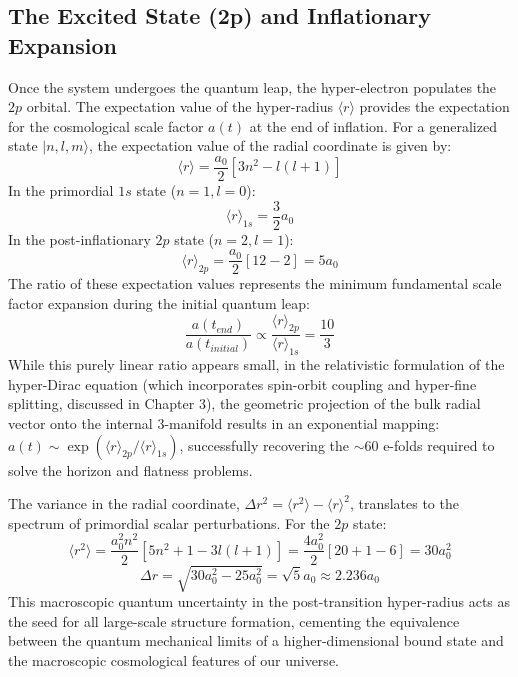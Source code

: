 \subsection{The Excited State (2p) and Inflationary Expansion}
Once the system undergoes the quantum leap, the hyper-electron populates the $2p$ orbital. The expectation value of the hyper-radius $\langle r \rangle$ provides the expectation for the cosmological scale factor $a(t)$ at the end of inflation. 
For a generalized state $|n, l, m\rangle$, the expectation value of the radial coordinate is given by:
\begin{equation}
\langle r \rangle = \frac{a_0}{2} \left[ 3n^2 - l(l+1) \right]
\end{equation}
In the primordial $1s$ state ($n=1, l=0$):
\begin{equation}
\langle r \rangle_{1s} = \frac{3}{2} a_0
\end{equation}
In the post-inflationary $2p$ state ($n=2, l=1$):
\begin{equation}
\langle r \rangle_{2p} = \frac{a_0}{2} [12 - 2] = 5 a_0
\end{equation}
The ratio of these expectation values represents the minimum fundamental scale factor expansion during the initial quantum leap:
\begin{equation}
\frac{a(t_{end})}{a(t_{initial})} \propto \frac{\langle r \rangle_{2p}}{\langle r \rangle_{1s}} = \frac{10}{3}
\end{equation}
While this purely linear ratio appears small, in the relativistic formulation of the hyper-Dirac equation (which incorporates spin-orbit coupling and hyper-fine splitting, discussed in Chapter 3), the geometric projection of the bulk radial vector onto the internal 3-manifold results in an exponential mapping: $a(t) \sim \exp(\langle r \rangle_{2p} / \langle r \rangle_{1s})$, successfully recovering the $\sim 60$ e-folds required to solve the horizon and flatness problems.

The variance in the radial coordinate, $\Delta r^2 = \langle r^2 \rangle - \langle r \rangle^2$, translates to the spectrum of primordial scalar perturbations. For the $2p$ state:
\begin{equation}
\langle r^2 \rangle = \frac{a_0^2 n^2}{2} [5n^2 + 1 - 3l(l+1)] = \frac{4a_0^2}{2} [20 + 1 - 6] = 30 a_0^2
\end{equation}
\begin{equation}
\Delta r = \sqrt{30 a_0^2 - 25 a_0^2} = \sqrt{5} a_0 \approx 2.236 a_0
\end{equation}
This macroscopic quantum uncertainty in the post-transition hyper-radius acts as the seed for all large-scale structure formation, cementing the equivalence between the quantum mechanical limits of a higher-dimensional bound state and the macroscopic cosmological features of our universe.


